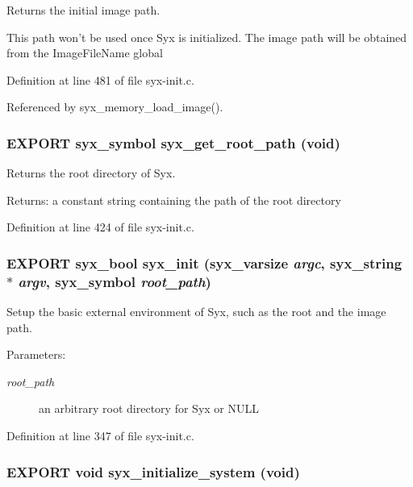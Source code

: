Returns the initial image path.

This path won't be used once Syx is initialized. The image path will be obtained from the ImageFileName global 

Definition at line 481 of file syx-init.c.

Referenced by syx\_\-memory\_\-load\_\-image().\hypertarget{syx-init_8h_c0d78d41f79e4707e3406d10734fc441}{
\subsubsection{\setlength{\rightskip}{0pt plus 5cm}EXPORT {\bf syx\_\-symbol} syx\_\-get\_\-root\_\-path (void)}}
\label{syx-init_8h_c0d78d41f79e4707e3406d10734fc441}


Returns the root directory of Syx.

\begin{Desc}
\item[Returns:]a constant string containing the path of the root directory \end{Desc}


Definition at line 424 of file syx-init.c.\hypertarget{syx-init_8h_8d6c7488dbeffcee4690492bdd2f3a91}{
\subsubsection{\setlength{\rightskip}{0pt plus 5cm}EXPORT {\bf syx\_\-bool} syx\_\-init ({\bf syx\_\-varsize} {\em argc}, \/  {\bf syx\_\-string} $\ast$ {\em argv}, \/  {\bf syx\_\-symbol} {\em root\_\-path})}}
\label{syx-init_8h_8d6c7488dbeffcee4690492bdd2f3a91}


Setup the basic external environment of Syx, such as the root and the image path.

\begin{Desc}
\item[Parameters:]
\begin{description}
\item[{\em root\_\-path}]an arbitrary root directory for Syx or NULL \end{description}
\end{Desc}


Definition at line 347 of file syx-init.c.\hypertarget{syx-init_8h_05223a080e6d39766c81442245d6bf37}{
\subsubsection{\setlength{\rightskip}{0pt plus 5cm}EXPORT void syx\_\-initialize\_\-system (void)}}
\label{syx-init_8h_05223a080e6d39766c81442245d6bf37}


